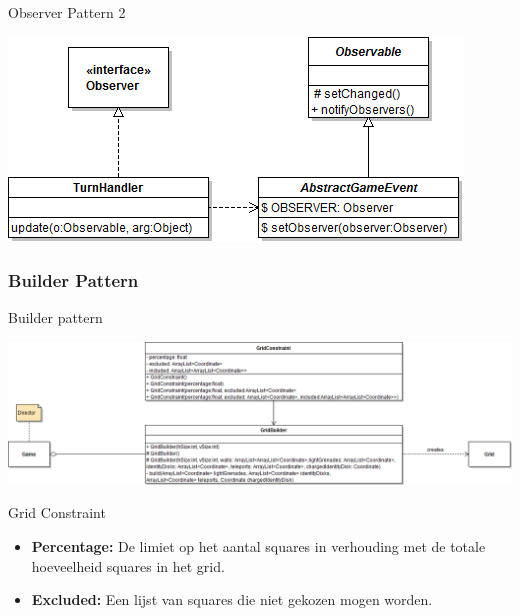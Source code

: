 \documentclass[t]{beamer}
\begin{document}
\begin{frame}{Observer Pattern 2}
\begin{center}
\includegraphics[width=1\linewidth]{images/observer2}
\end{center}
\end{frame}

\subsubsection{Builder Pattern}
\begin{frame}{Builder pattern}
\begin{center}
\vspace{0.3in}
\includegraphics[width=1\linewidth]{images/GridBuilder}
\end{center}
\end{frame}
\begin{frame}{Grid Constraint}
\vspace{0.4in}
\begin{itemize}
	\item \textbf{Percentage:} De limiet op het aantal squares in verhouding met de totale hoeveelheid squares in het grid.
	\item \textbf{Excluded:} Een lijst van squares die niet gekozen mogen worden.
\end{itemize}
\end{frame}
\end{document}
